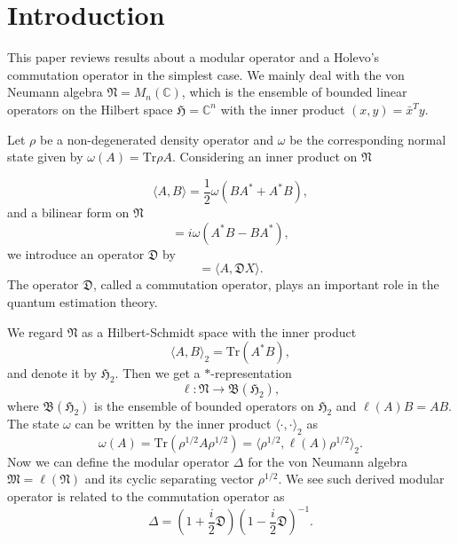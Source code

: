 \section{Introduction}
This paper reviews results about a modular operator \cite{Longo_1978} and a Holevo's commutation operator \cite{Holevo_1977} in the simplest case.
We mainly deal with the von Neumann algebra $\mathfrak{N}=M_n(\mathbb{C})$, 
which is the ensemble of bounded linear operators on 
the Hilbert space $\mathfrak{H}=\mathbb{C}^n$ with the inner product $(x,y)=\bar{x}^Ty$. 

Let $\rho$ be a non-degenerated density operator and 
$\omega$ be the corresponding normal state given by $\omega(A)=\mbox{Tr}\rho A$.
Considering an inner product on $\mathfrak{N}$

\begin{equation}
\label{innerP}
\langle A, B \rangle =\frac{1}{2}\omega(BA^{\ast}+A^{\ast}B),
\end{equation}
and a bilinear form on $\mathfrak{N}$
\begin{equation}
[A,B]=i\omega(A^{\ast}B-BA^{\ast}),
\end{equation}
we introduce an operator $\mathfrak{D}$ by 
\begin{equation}
[A,X]=\langle A, \mathfrak{D}X\rangle.
\end{equation}
The operator $\mathfrak{D}$, called a commutation operator, plays an important role in the quantum estimation theory.

We regard $\mathfrak{N}$ as a Hilbert-Schmidt space with the inner product
$$
\langle A, B \rangle_2 =\mbox{Tr}(A^{\ast}B),
$$
and denote it by $\mathfrak{H}_2$.
Then we get a $\ast$-representation 
$$
\ell :\mathfrak{N}\to \mathfrak{B}(\mathfrak{H}_2),
$$
where $\mathfrak{B}(\mathfrak{H}_2)$ is the ensemble of bounded operators on $\mathfrak{H}_2$
and $\ell(A)B=AB$.
The state $\omega$ can be written by the inner product $\langle \cdot, \cdot\rangle_2$ as 
$$
\omega(A)=\mbox{Tr}(\rho^{1/2}A\rho^{1/2})=\langle \rho^{1/2},\ell(A)\rho^{1/2}\rangle_2 .
$$
Now we can define the modular operator $\Delta$ for the von Neumann algebra $\mathfrak{M}=\ell(\mathfrak{N})$ and its cyclic separating vector $\rho^{1/2}$. 
We see such derived modular operator is related to the commutation operator
as
$$
    \Delta=\left(1+\frac{i}{2}\mathfrak{D}\right)\left(1-\frac{i}{2}\mathfrak{D}\right)^{-1}.
$$
